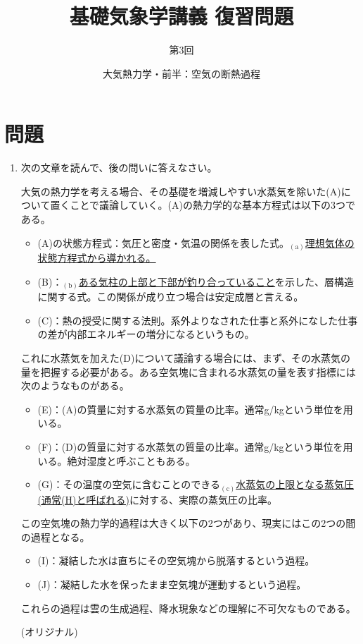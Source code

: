 \documentclass{jsarticle}
\newenvironment{problems}
{
  \renewcommand\labelenumi{\doublebox{\arabic{enumi}}}
  \begin{enumerate}
}{
  \end{enumerate}
  \renewcommand\labelenumi{\arabic{enumi}.}
}
\begin{document}
\title{基礎気象学講義 復習問題} %
\author{第3回} %
\date{大気熱力学・前半：空気の断熱過程} %
\maketitle

\section{問題}

    \begin{problems}
    \item 次の文章を読んで、後の問いに答えなさい。
        \begin{screen}
          大気の熱力学を考える場合、その基礎を増減しやすい水蒸気を除いた(A)について置くことで議論していく。(A)の熱力学的な基本方程式は以下の3つである。
          \begin{itemize}
          \item (A)の状態方程式：気圧と密度・気温の関係を表した式。$_{(\mathrm{a})}$\underline{理想気体の状態方程式から導かれる。}
          \item (B)：$_{(\mathrm{b})}$\underline{ある気柱の上部と下部が釣り合っていること}を示した、層構造に関する式。この関係が成り立つ場合は安定成層と言える。
          \item (C)：熱の授受に関する法則。系外よりなされた仕事と系外になした仕事の差が内部エネルギーの増分になるというもの。
          \end{itemize}
          これに水蒸気を加えた(D)について議論する場合には、まず、その水蒸気の量を把握する必要がある。ある空気塊に含まれる水蒸気の量を表す指標には次のようなものがある。
          \begin{itemize}
          \item (E)：(A)の質量に対する水蒸気の質量の比率。通常g/kgという単位を用いる。
          \item (F)：(D)の質量に対する水蒸気の質量の比率。通常g/kgという単位を用いる。絶対湿度と呼ぶこともある。
          \item (G)：その温度の空気に含むことのできる$_{(\mathrm{c})}$\underline{水蒸気の上限となる蒸気圧(通常(H)と呼ばれる)}に対する、実際の蒸気圧の比率。
          \end{itemize}
          この空気塊の熱力学的過程は大きく以下の2つがあり、現実にはこの2つの間の過程となる。
          \begin{itemize}
          \item (I)：凝結した水は直ちにその空気塊から脱落するという過程。
          \item (J)：凝結した水を保ったまま空気塊が運動するという過程。
          \end{itemize}
          これらの過程は雲の生成過程、降水現象などの理解に不可欠なものである。
            \begin{flushright}
            (オリジナル)
            \end{flushright}
        \end{screen}


\end{problems}
\end{document}
